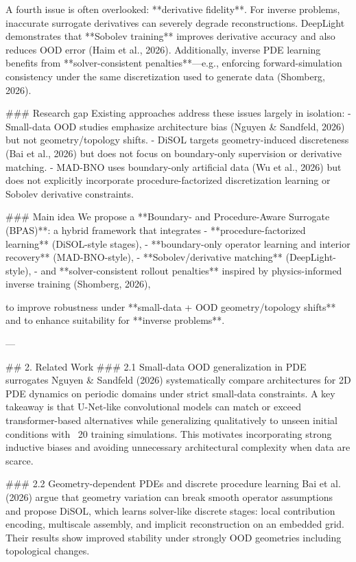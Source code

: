 A fourth issue is often overlooked: **derivative fidelity**. For inverse problems, inaccurate surrogate derivatives can severely degrade reconstructions. DeepLight demonstrates that **Sobolev training** improves derivative accuracy and also reduces OOD error (Haim et al., 2026). Additionally, inverse PDE learning benefits from **solver-consistent penalties**—e.g., enforcing forward-simulation consistency under the same discretization used to generate data (Shomberg, 2026).

### Research gap
Existing approaches address these issues largely in isolation:
- Small-data OOD studies emphasize architecture bias (Nguyen & Sandfeld, 2026) but not geometry/topology shifts.
- DiSOL targets geometry-induced discreteness (Bai et al., 2026) but does not focus on boundary-only supervision or derivative matching.
- MAD-BNO uses boundary-only artificial data (Wu et al., 2026) but does not explicitly incorporate procedure-factorized discretization learning or Sobolev derivative constraints.

### Main idea
We propose a **Boundary- and Procedure-Aware Surrogate (BPAS)**: a hybrid framework that integrates
- **procedure-factorized learning** (DiSOL-style stages),
- **boundary-only operator learning and interior recovery** (MAD-BNO-style),
- **Sobolev/derivative matching** (DeepLight-style),
- and **solver-consistent rollout penalties** inspired by physics-informed inverse training (Shomberg, 2026),

to improve robustness under **small-data + OOD geometry/topology shifts** and to enhance suitability for **inverse problems**.

---

## 2. Related Work
### 2.1 Small-data OOD generalization in PDE surrogates
Nguyen & Sandfeld (2026) systematically compare architectures for 2D PDE dynamics on periodic domains under strict small-data constraints. A key takeaway is that U-Net-like convolutional models can match or exceed transformer-based alternatives while generalizing qualitatively to unseen initial conditions with ~20 training simulations. This motivates incorporating strong inductive biases and avoiding unnecessary architectural complexity when data are scarce.

### 2.2 Geometry-dependent PDEs and discrete procedure learning
Bai et al. (2026) argue that geometry variation can break smooth operator assumptions and propose DiSOL, which learns solver-like discrete stages: local contribution encoding, multiscale assembly, and implicit reconstruction on an embedded grid. Their results show improved stability under strongly OOD geometries including topological changes.

